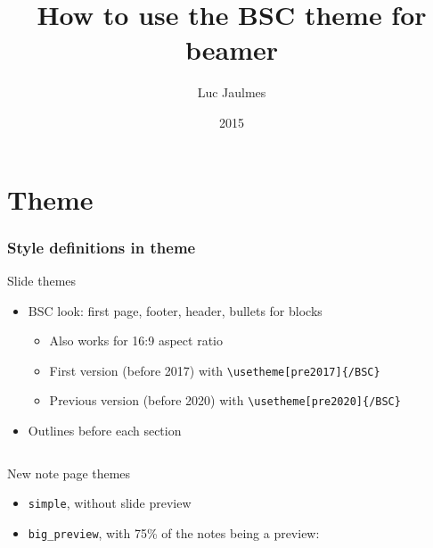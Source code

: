 \documentclass[aspectratio=169,c,12pt]{beamer}
\title[BSC styled beamer tutorial]{How to use the BSC theme for beamer}
\author{Luc Jaulmes}
\date{2015}
\begin{document}
\begin{frame}
\titlepage
\end{frame}

\section{Theme}

\begin{frame}[fragile]
	\frametitle{Style definitions in theme}
	\begin{block}{Slide themes}
		\begin{itemize}
			\item BSC look: first page, footer, header, bullets for blocks
			\begin{itemize}
				\item Also works for 16:9 aspect ratio
				\item First version (before 2017) with \verb|\usetheme[pre2017]{/BSC}|
				\item Previous version (before 2020) with \verb|\usetheme[pre2020]{/BSC}|
			\end{itemize}
			\item Outlines before each section
		\end{itemize}
	\end{block}
	\pause
	\begin{columns}[T]
		\begin{column}{.4\linewidth}
			\begin{block}{New note page themes}
				\begin{itemize}
					\item \verb|simple|, without slide preview
					\item \verb|big_preview|, with 75\% of the notes being a preview:
				\end{itemize}%
			\end{block}
		\end{column}
		\begin{column}{.65\linewidth}
		\end{column}
	\end{columns}
\end{frame}
\end{document}
